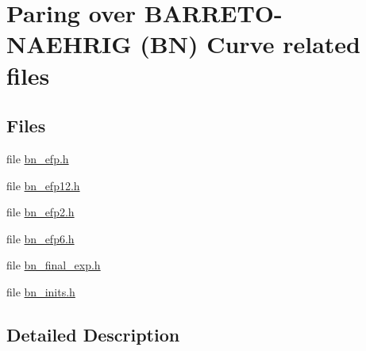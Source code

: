 \hypertarget{group__bn12}{}\section{Paring over B\+A\+R\+R\+E\+T\+O-\/\+N\+A\+E\+H\+R\+IG (BN) Curve related files}
\label{group__bn12}
\subsection*{Files}
\begin{DoxyCompactItemize}
\item 
file \hyperlink{bn__efp_8h}{bn\+\_\+efp.\+h}
\item 
file \hyperlink{bn__efp12_8h}{bn\+\_\+efp12.\+h}
\item 
file \hyperlink{bn__efp2_8h}{bn\+\_\+efp2.\+h}
\item 
file \hyperlink{bn__efp6_8h}{bn\+\_\+efp6.\+h}
\item 
file \hyperlink{bn__final__exp_8h}{bn\+\_\+final\+\_\+exp.\+h}
\item 
file \hyperlink{bn__inits_8h}{bn\+\_\+inits.\+h}
\end{DoxyCompactItemize}


\subsection{Detailed Description}

